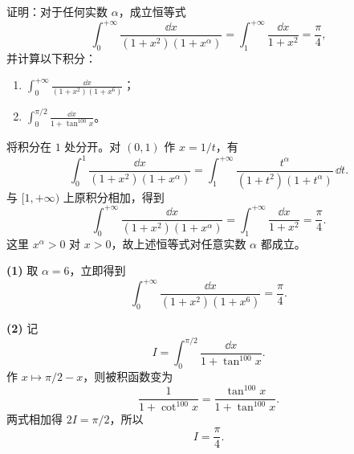 \begin{xreferenceproblem}[1]
证明：对于任何实数 $\alpha$，成立恒等式
  \[
    \int_0^{+\infty}\frac{\dd x}{(1+x^2)(1+x^\alpha)}
    =\int_1^{+\infty}\frac{\dd x}{1+x^2}
    =\frac\pi4,
  \]
  并计算以下积分：
  \begin{enumerate}[label=(\arabic*)]
    \item $\displaystyle\int_0^{+\infty}\frac{\dd x}{(1+x^2)(1+x^6)}$；
    \item $\displaystyle\int_0^{\pi/2}\frac{\dd x}{1+\tan^{100}x}$。
  \end{enumerate}
\end{xreferenceproblem}
\begin{xsolution}
将积分在 $1$ 处分开。对 $(0,1)$ 作 $x=1/t$，有
\[
  \int_0^1\frac{\dd x}{(1+x^2)(1+x^\alpha)}
  =\int_1^{+\infty}\frac{t^\alpha}{(1+t^2)(1+t^\alpha)}\,\dd t.
\]
与 $[1,+\infty)$ 上原积分相加，得到
\[
  \int_0^{+\infty}\frac{\dd x}{(1+x^2)(1+x^\alpha)}
  =\int_1^{+\infty}\frac{\dd x}{1+x^2}=\frac\pi4.
\]
这里 $x^\alpha>0$ 对 $x>0$，故上述恒等式对任意实数 $\alpha$ 都成立。

\textbf{(1)} 取 $\alpha=6$，立即得到
\[
  \boxed{\int_0^{+\infty}\frac{\dd x}{(1+x^2)(1+x^6)}=\frac\pi4}.
\]

\textbf{(2)} 记
\[
  I=\int_0^{\pi/2}\frac{\dd x}{1+\tan^{100}x}.
\]
作 $x\mapsto\pi/2-x$，则被积函数变为
\[
  \frac1{1+\cot^{100}x}=\frac{\tan^{100}x}{1+\tan^{100}x}.
\]
两式相加得 $2I=\pi/2$，所以
\[
  \boxed{I=\frac\pi4}.
\]
\end{xsolution}


